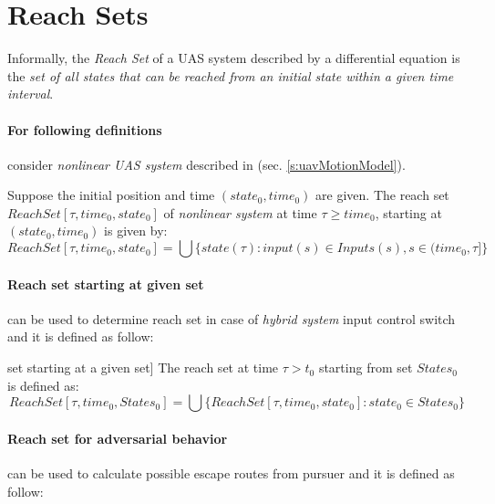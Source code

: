 \section{Reach Sets}\label{s:ReachSets}
    \noindent Informally, the \emph{Reach Set} of a UAS system described by a differential equation is the \emph{set of all states that can be reached from an initial state within a given time interval}.

    \paragraph{For following definitions} consider \emph{nonlinear UAS system} described in (sec. \ref{s:uavMotionModel}).
    
    \begin{definition}\label{def:reachset01}
        Suppose the initial position
        and time $(state_0, time_0)$ are given. The reach set $ReachSet[\tau, time_0, state_0]$ of \emph{nonlinear system} at time $\tau \ge time_0$, starting at $(state_0, time_0)$ is given by:
        \begin{equation}
            ReachSet[\tau, time_0, state_0] = \bigcup \{state(\tau):input(s)\in Inputs(s),s \in (time_0,\tau]\}
        \end{equation}
    \end{definition}
    
    \paragraph{Reach set starting at given set} can be used to determine reach set in case of \emph{hybrid system} input control switch and it is defined as follow:
    \begin{definition}\label{def:ReachSetBasic} set starting at a given set]
        The reach set at time $\tau > t_0$ starting from set $States_0$ is defined as:
        \begin{equation}
            ReachSet[\tau, time_0, States_0] = \bigcup \{ReachSet[\tau, time_0, state_0]: state_0 \in States_0\}
        \end{equation}
    \end{definition}

    \paragraph{Reach set for adversarial behavior} can be used to calculate possible escape routes from pursuer and it is defined as follow:

